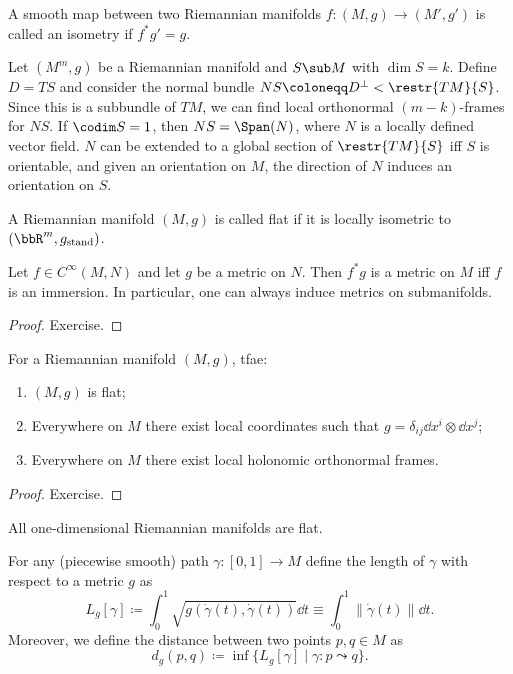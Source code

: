 \begin{defn}[Isometry]
A smooth map between two Riemannian manifolds $f:(M,g)\to(M',g')$ is called an isometry if $f^\ast g'=g$.
\end{defn}

\begin{cor}
Let $(M^m,g)$ be a Riemannian manifold and $S\sub M$ with $\dim S=k$. Define $D=TS$ and consider the normal bundle $NS\coloneqq D^\perp<\restr{TM}{S}$. Since this is a subbundle of $TM$, we can find local orthonormal $(m-k)$-frames for $NS$. If $\codim S=1$, then $NS=\Span(N)$, where $N$ is a locally defined vector field. $N$ can be extended to a global section of $\restr{TM}{S}$ iff $S$ is orientable, and given an orientation on $M$, the direction of $N$ induces an orientation on $S$.
\end{cor}


\begin{defn}
A Riemannian manifold $(M,g)$ is called flat if it is locally isometric to $(\bbR^m,g_{\text{stand}})$.
\end{defn}


\begin{thm}
Let $f\in C^\infty(M,N)$ and let $g$ be a metric on $N$. Then $f^\ast g$ is a metric on $M$ iff $f$ is an immersion. In particular, one can always induce metrics on submanifolds.
\end{thm}
\begin{proof}
Exercise.
\end{proof}

\begin{thm}
For a Riemannian manifold $(M,g)$,  \gls{tfae}:
\begin{enumerate}
    \item $(M,g)$ is flat;
    \item Everywhere on $M$ there exist local coordinates such that $g=\delta_{ij} \dd x^i\otimes \dd x^j$;
    \item Everywhere on $M$ there exist local holonomic orthonormal frames.
\end{enumerate}
\end{thm}
\begin{proof}
Exercise.
\end{proof}
\begin{cor}
All one-dimensional Riemannian manifolds are flat.
\end{cor}


\begin{defn}
    For any (piecewise smooth) path $\gamma:[0,1]\to M$ define the length of $\gamma$ with respect to a metric $g$ as
    \[L_g[\gamma]\coloneqq \int_0^1 \sqrt{g(\dot\gamma(t),\dot\gamma(t))}\dd t \equiv \int_0^1 \lVert\dot\gamma(t)\rVert \dd t.\]
    Moreover, we define the distance between two points $p,q\in M$ as 
    \[d_g(p,q)\coloneqq \inf \{L_g[\gamma]\mid \gamma:p\leadsto q\}.\]
\end{defn}

